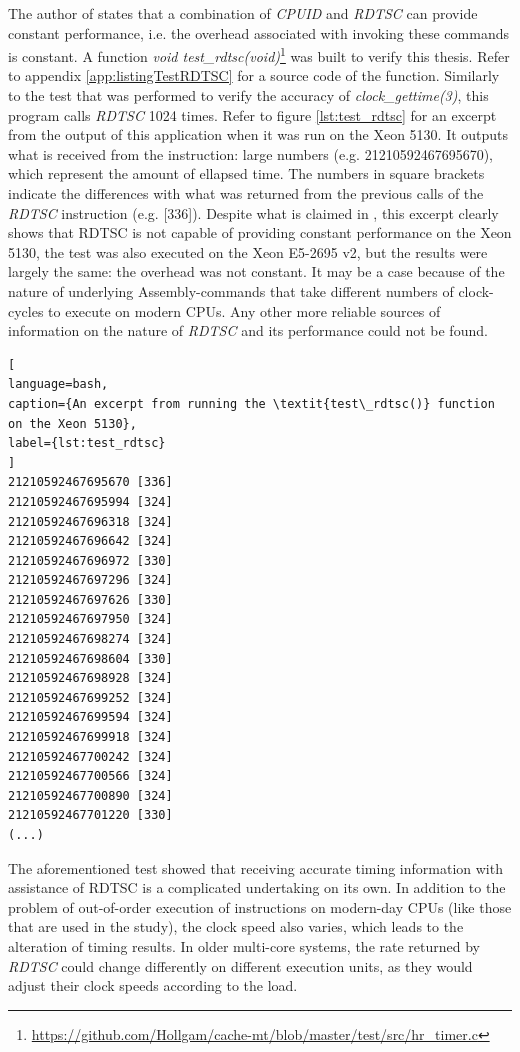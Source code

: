 The author of \cite{Kankowski2012} states that a combination of \textit{CPUID} and \textit{RDTSC} can provide constant performance, i.e. the overhead associated with invoking these commands is constant. A function \textit{void test\_rdtsc(void)}\footnote{\url{https://github.com/Hollgam/cache-mt/blob/master/test/src/hr\_timer.c}} was built to verify this thesis. Refer to appendix \ref{app:listingTestRDTSC} for a source code of the function. Similarly to the test that was performed to verify the accuracy of \textit{clock\_gettime(3)}, this program calls \textit{RDTSC} 1024 times. Refer to figure \ref{lst:test_rdtsc} for an excerpt from the output of this application when it was run on the Xeon 5130. It outputs what is received from the instruction: large numbers (e.g. 21210592467695670), which represent the amount of ellapsed time. The numbers in square brackets indicate the differences with what was returned from the previous calls of the \textit{RDTSC} instruction (e.g. [336]). Despite what is claimed in \cite{Kankowski2012}, this excerpt clearly shows that RDTSC is not capable of providing constant performance on the Xeon 5130, the test was also executed on the Xeon E5-2695 v2, but the results were largely the same: the overhead was not constant. It may be a case because of the nature of underlying Assembly-commands that take different numbers of clock-cycles to execute on modern CPUs. Any other more reliable sources of information on the nature of \textit{RDTSC} and its performance could not be found.

\begin{lstlisting}[
language=bash,
caption={An excerpt from running the \textit{test\_rdtsc()} function on the Xeon 5130},
label={lst:test_rdtsc}
]
21210592467695670 [336]
21210592467695994 [324]
21210592467696318 [324]
21210592467696642 [324]
21210592467696972 [330]
21210592467697296 [324]
21210592467697626 [330]
21210592467697950 [324]
21210592467698274 [324]
21210592467698604 [330]
21210592467698928 [324]
21210592467699252 [324]
21210592467699594 [324]
21210592467699918 [324]
21210592467700242 [324]
21210592467700566 [324]
21210592467700890 [324]
21210592467701220 [330]
(...)
\end{lstlisting}

The aforementioned test showed that receiving accurate timing information with assistance of RDTSC is a complicated undertaking on its own. In addition to the problem of out-of-order execution of instructions on modern-day CPUs (like those that are used in the study), the clock speed also varies, which leads to the alteration of timing results. In older multi-core systems, the rate returned by \textit{RDTSC} could change differently on different execution units, as they would adjust their clock speeds according to the load.


